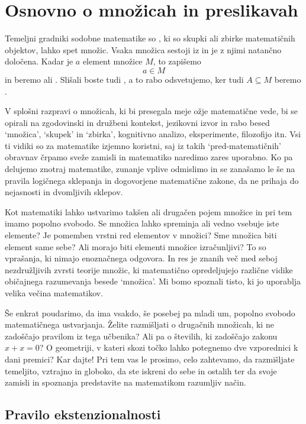\chapter{Osnovno o množicah in preslikavah}
\label{cha:mnozice-in-preslikave}


Temeljni gradniki sodobne matematike so , ki so skupki ali zbirke matematičnih
objektov, lahko spet množic. Vsaka množica sestoji iz  in je z njimi
natančno določena.
%
Kadar je $a$ element množice $M$, to zapišemo $$a \in M$$ in beremo  ali .
%
Slišali boste tudi , a to rabo odsvetujemo, ker tudi $A \subseteq M$ beremo .

V splošni razpravi o množicah, ki bi presegala meje ožje matematične vede, bi se opirali na
zgodovinski in družbeni kontekst, jezikovni izvor in rabo besed `množica', `skupek' in
`zbirka', kognitivno analizo, eksperimente, filozofijo itn. Vsi ti vidiki so za matematike
izjemno koristni, saj iz takih `pred-matematičnih' obravnav črpamo sveže zamisli in
matematiko naredimo zares uporabno. Ko pa delujemo znotraj matematike, zunanje vplive
odmislimo in se zanašamo le še na pravila logičnega sklepanja in dogovorjene matematične zakone, da ne
prihaja do nejasnosti in dvomljivih sklepov.

Kot matematiki lahko ustvarimo takšen ali drugačen pojem množice in pri tem imamo popolno
svobodo. Se množica lahko spreminja ali vedno vsebuje iste elemente? Je pomemben vrstni red
elementov v množici? Sme množica biti element same sebe? Ali morajo biti elementi množice
izračunljivi? To so vprašanja, ki nimajo enoznačnega odgovora. In res je znanih več med
seboj nezdružljivih zvrsti teorije množic, ki matematično opredeljujejo različne vidike
običajnega razumevanja besede `množica'. Mi bomo spoznali tisto, ki jo uporablja velika večina matematikov.

Še enkrat poudarimo, da ima vsakdo, še posebej pa mladi um, popolno svobodo matematičnega
ustvarjanja. Želite razmišljati o drugačnih množicah, ki ne zadoščajo pravilom iz tega učbenika?
Ali pa o številih, ki zadoščajo zakonu $x + x = 0$? O geometriji, v
kateri skozi točko lahko potegnemo dve vzporednici k dani premici? Kar dajte! Pri tem vas
le prosimo, celo zahtevamo, da razmišljate temeljito, vztrajno in globoko, da ste iskreni
do sebe in ostalih ter da svoje zamisli in spoznanja predstavite na matematikom razumljiv
način.


\section{Pravilo ekstenzionalnosti}
\label{sec:nacelo-ekstenzionalnosti}

